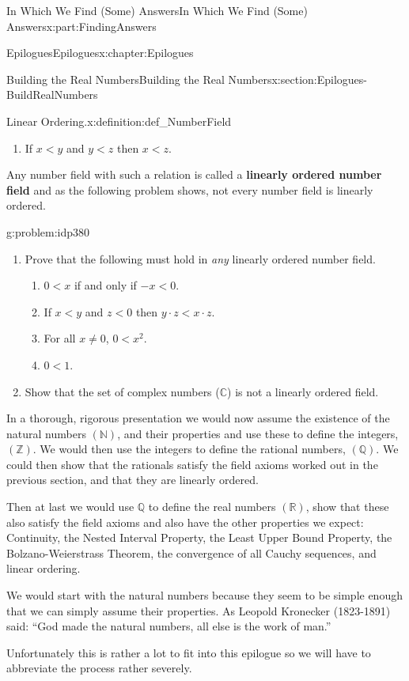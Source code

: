 \documentclass[oneside,10pt,]{book}
\newcommand{\terminology}[1]{\textbf{#1}}
\numberwithin{equation}{section}
\newcommand{\CC}{\mathbb {C}}
\newcommand{\RR}{\mathbb {R}}
\newcommand{\QQ}{\mathbb {Q}}
\newcommand{\NN}{\mathbb {N}}
\newcommand{\ZZ}{\mathbb {Z}}
\newcommand{\lt}{<}
\begin{document}
\begin{partptx}{In Which We Find (Some) Answers}{}{In Which We Find (Some) Answers}{}{}{x:part:FindingAnswers}
\begin{chapterptx}{Epilogues}{}{Epilogues}{}{}{x:chapter:Epilogues}
\begin{sectionptx}{Building the Real Numbers}{}{Building the Real Numbers}{}{}{x:section:Epilogues-BuildRealNumbers}
\begin{introduction}{}
\begin{definition}{Linear Ordering.}{x:definition:def_NumberField}
\begin{enumerate}
\item{}If \(x\lt y\) and \(y\lt z\) then \(x\lt z\).%
\end{enumerate}
%
\end{definition}
Any number field with such a relation is called a \terminology{linearly ordered number field} and as the following problem shows, not every number field is linearly ordered.%
\begin{problem}{}{g:problem:idp380}%
\begin{enumerate}[font=\bfseries,label=(\alph*),ref=\alph*]
\item{}Prove that the following must hold in \emph{any} linearly ordered number field.%
\par
%
\begin{enumerate}
\item{}\(0\lt x\) if and only if \(-x\lt 0\).%
\item{}If \(x\lt y\) and \(z\lt 0\) then \(y\cdot z\lt x\cdot z\).%
\item{}For all \(x\neq 0\), \(0\lt x^2\).%
\item{}\(0\lt 1\).%
\end{enumerate}
%
\item{}Show that the set of complex numbers (\(\CC\)) is not a linearly ordered field.%
\end{enumerate}
\end{problem}
In a thorough, rigorous presentation we would now assume the existence of the natural numbers \((\NN)\), and their properties and use these to define the integers, \((\ZZ)\). We would then use the integers to define the rational numbers, \((\QQ)\). We could then show that the rationals satisfy the field axioms worked out in the previous section, and that they are linearly ordered.%
\par
Then \textemdash{} at last \textemdash{} we would use \(\QQ\) to define the real numbers \((\RR)\), show that these also satisfy the field axioms and also have the other properties we expect: Continuity, the Nested Interval Property, the Least Upper Bound Property, the Bolzano-Weierstrass Theorem, the convergence of all Cauchy sequences, and linear ordering.%
\par
We would start with the natural numbers because they seem to be simple enough that we can simply assume their properties. As Leopold Kronecker (1823-1891) said: ``God made the natural numbers, all else is the work of man.''%
\par
Unfortunately this is rather a lot to fit into this epilogue so we will have to abbreviate the process rather severely.%

\end{introduction}
\end{sectionptx}
\end{chapterptx}
\end{partptx}
\end{document}

